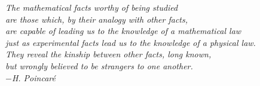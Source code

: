 





\clearpage
\thispagestyle{empty}
\cleardoublepage

\clearpage
\thispagestyle{empty}
\begin{flushright}
\null{}
\textit{The mathematical facts worthy of being studied\\
are those which, by their analogy with other facts,\\
are capable of leading us to the knowledge of a mathematical law\\
just as experimental facts lead us to the knowledge of a physical law.\\
They reveal the kinship between other facts, long known,\\
but wrongly believed to be strangers to one another.\\
\hfill\break
$-$H. Poincaré}\\
\null
\end{flushright}
\clearpage

